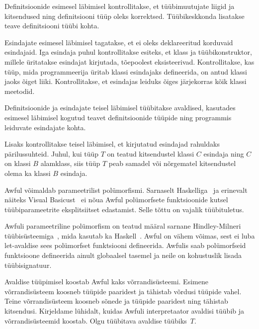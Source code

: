 \documentclass[12pt]{article}
\begin{document}
        Definitsioonide esimesel läbimisel kontrollitakse, et tüübimuutujate liigid ja kitsendused ning definitsiooni tüüp oleks korrektsed. Tüübikeskkonda lisatakse teave definitsiooni tüübi kohta.

        Esindajate esimesel läbimisel tagatakse, et ei oleks deklareeritud korduvaid esindajaid. Iga esindaja puhul kontrollitakse esiteks, et klass ja tüübikonstruktor, millele üritatakse esindajat kirjutada, tõepoolest eksisteerivad. Kontrollitakse, kas tüüp, mida programmeerija üritab klassi esindajaks defineerida, on antud klassi jaoks õiget liiki. Kontrollitakse, et esindajas leiduks õiges järjekorras kõik klassi meetodid.

        Definitsioonide ja esindajate teisel läbimisel tüübitakse avaldised, kasutades esimesel läbimisel kogutud teavet definitsioonide tüüpide ning programmis leiduvate esindajate kohta.

        Lisaks kontrollitakse teisel läbimisel, et kirjutatud esindajad rahuldaks pärilussuhteid. Juhul, kui tüüp $T$ on teatud kitsendustel klassi $C$ esindaja ning $C$ on klassi $B$ alamklass, siis tüüp $T$ peab samadel või nõrgematel kitsendustel olema ka klassi $B$ esindaja.

        Awful võimaldab parameetrilist polümorfismi. Sarnaselt Haskelliga~\cite{Has} ja erinevalt näiteks Visual Basicust~\cite{Vis} ei nõua Awful polümorfsete funktsioonide kutsel tüübiparameetrite eksplitsiitset edastamist. Selle tõttu on vajalik tüübituletus.

        Awfuli parameetriline polümorfism on teatud määral sarnane Hindley-Milneri tüübisüsteemiga~\cite{A}, mida kasutab ka Haskell~\cite{Has}. Awful on vähem võimas, sest ei luba let-avaldise sees polümorfset funktsiooni defineerida. Awfulis saab polümorfseid funktsioone defineerida ainult globaalsel tasemel ja neile on kohustuslik lisada tüübisignatuur.

        Avaldise tüüpimisel koostab Awful kaks võrrandisüsteemi. Esimene võrrandisüsteem koosneb tüüpide paaridest ja tähistab võrdusi tüüpide vahel. Teine võrrandisüsteem koosneb sõnede ja tüüpide paaridest ning tähistab kitsendusi. Kirjeldame lühidalt, kuidas Awfuli interpretaator avaldisi tüübib ja võrrandisüsteemid koostab. Olgu tüübitava avaldise tüübiks~$T$.
\end{document}
